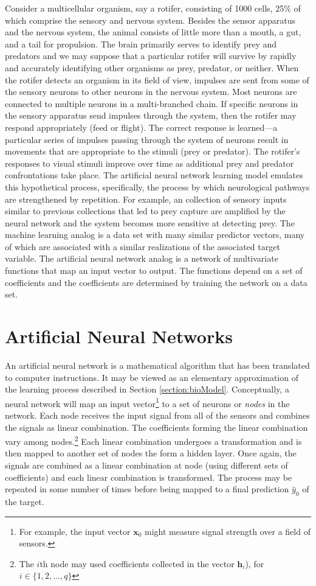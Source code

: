 \documentclass[graybox,envcountchap]{svmono}
\newcommand{\hf}{\mathbf{h}}
\newcommand{\xf}{\mathbf{x}}
\newcommand{\nn}{neural network}
\newcommand{\w}{\widehat}
\begin{document}
Consider a multicellular organism, say a rotifer, consisting of 1000 cells, 25\% of which comprise the sensory and nervous system.  Besides the sensor apparatus and the nervous system, the animal consists of little more than a  mouth, a gut, and a tail for propulsion. The brain primarily serves to identify prey and predators and we may suppose that a particular rotifer will survive by rapidly and accurately identifying other organisms as prey, predator, or neither. When the rotifer detects an organism in its field of view, impulses are sent from some of the sensory neurons to other neurons in the nervous system.  Most neurons are connected to multiple neurons in a multi-branched chain.  If specific neurons in the sensory apparatus send impulses through the system, then the rotifer may respond appropriately (feed or flight). The correct response is learned---a particular series of impulses passing through the system of neurons result in movements that are appropriate to the stimuli (prey or predator).  The rotifer's responses to visual stimuli improve over time as additional prey and predator confrontations take place.  The artificial {\nn } learning model emulates this hypothetical process, specifically, the process by which neurological pathways are strengthened by repetition. For example, an collection of sensory inputs similar to previous collections that led to prey capture are amplified by the neural network and the system becomes more sensitive at detecting prey.  The machine learning analog is a data set with many similar predictor vectors, many of which are associated with a similar realizations of the associated target variable. 
The artificial {\nn } analog is a network of multivariate functions that map an input vector to output. The functions depend on a set of coefficients and the coefficients are determined by training the network on a data set. 

\section{Artificial Neural Networks}

An artificial {\nn } is a mathematical algorithm that has been translated to computer instructions. 
It may be viewed as an elementary approximation of the learning process described in Section \ref{section:bioModel}.   
Conceptually, a {\nn } will map an input vector\footnote{For example, the input vector $\xf_0$ might measure signal strength over a field of sensors.} to a set of neurons or \emph{nodes} in the network. Each node receives the input signal from all of the sensors and combines the signals as linear combination. The coefficients forming the linear combination vary among nodes.\footnote{The $i$th node may used coefficients collected in the vector $\hf_i$), for $i \in \{1,2,\ldots,q \}$} Each linear combination undergoes a transformation and is then mapped to another set of nodes the form a hidden layer.  Once again, the signals are combined as a linear combination at node (using different sets of coefficients) and each linear combination is transformed. The process may be repeated in some number of times before being mapped to a final prediction $\w{y}_0$  of the target. 
\end{document}

